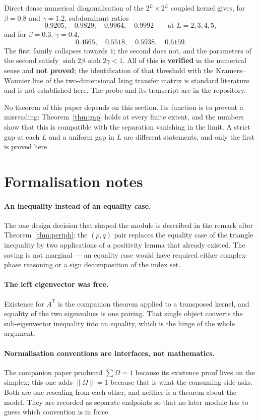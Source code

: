 \documentclass[11pt]{article}
\theoremstyle{definition}
\newcommand{\Om}{\Omega}
\begin{document}
Direct dense numerical diagonalisation of the $2^L\times2^L$ coupled kernel
gives, for $\beta=0.8$ and $\gamma=1.2$, subdominant ratios
\[
  0.9205,\quad 0.9829,\quad 0.9964,\quad 0.9992
  \qquad\text{at } L=2,3,4,5,
\]
and for $\beta=0.3$, $\gamma=0.4$,
\[
  0.4665,\quad 0.5518,\quad 0.5938,\quad 0.6159 .
\]
The first family collapses towards $1$; the second does not, and the parameters
of the second satisfy $\sinh 2\beta\,\sinh 2\gamma<1$.  All of this is
\textbf{verified} in the numerical sense and \textbf{not proved}; the
identification of that threshold with the Kramers--Wannier line of the
two-dimensional Ising transfer matrix is standard literature and is not
established here.  The probe and its transcript are in the repository.

No theorem of this paper depends on this section.  Its function is to prevent a
misreading: Theorem~\ref{thm:gap} holds at every finite extent, and the numbers
show that this is compatible with the separation vanishing in the limit.  A
strict gap at each $L$ and a uniform gap in $L$ are different statements, and
only the first is proved here.

\section{Formalisation notes}

\paragraph{An inequality instead of an equality case.}  The one design decision
that shaped the module is described in the remark after
Theorem~\ref{thm:periph}: the $(p,q)$ pair replaces the equality case of the
triangle inequality by two applications of a positivity lemma that already
existed.  The saving is not marginal --- an equality case would have required
either complex-phase reasoning or a sign decomposition of the index set.

\paragraph{The left eigenvector was free.}  Existence for $A^{\mathsf T}$ is the
companion theorem applied to a transposed kernel, and equality of the two
eigenvalues is one pairing.  That single object converts the sub-eigenvector
inequality into an equality, which is the hinge of the whole argument.

\paragraph{Normalisation conventions are interfaces, not mathematics.}  The
companion paper produced $\sum\Om=1$ because its existence proof lives on the
simplex; this one adds $\|\Om\|=1$ because that is what the consuming side
asks.  Both are one rescaling from each other, and neither is a theorem about
the model.  They are recorded as separate endpoints so that no later module has
to guess which convention is in force.
\end{document}
